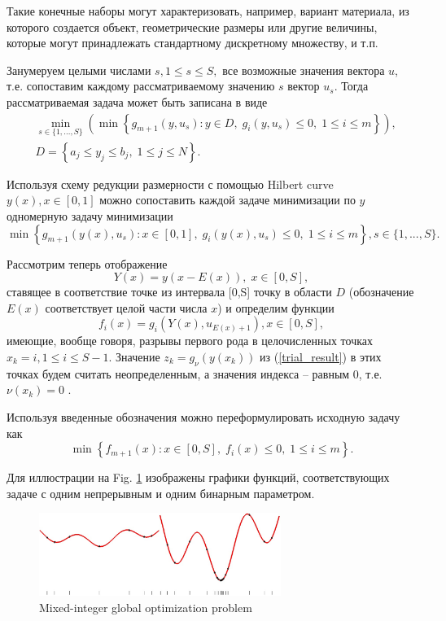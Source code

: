 \documentclass[
11pt,%
tightenlines,%
twoside,%
onecolumn,%
nofloats,%
nobibnotes,%
nofootinbib,%
superscriptaddress,%
noshowpacs,%
centertags]%
{revtex4}
\begin{document}
Такие конечные наборы могут характеризовать, например, вариант материала, из которого создается объект, геометрические размеры или другие величины, которые могут принадлежать стандартному дискретному множеству, и т.п.

Занумеруем целыми числами $s, 1\leq s \leq S,$ все возможные значения вектора $u$, т.е. сопоставим каждому рассматриваемому значению $s$ вектор $u_s$. 
Тогда рассматриваемая задача может быть записана в виде 
\begin{eqnarray}\label{problem_is}
& \min_{s\in\{1,...,S\}}\left(\min{\left\{ g_{m+1}(y,u_s):y\in D, \; g_i(y,u_s)\leq 0, \; 1 \leq i \leq m\right\}}\right),\\
& D=\left\{ a_j\leq y_j \leq b_j, \; 1 \leq j\leq N \right\}.\nonumber 
\end{eqnarray}

Используя схему редукции размерности с помощью Hilbert curve $y(x), x\in [0,1]$ можно сопоставить каждой задаче минимизации по $y$ одномерную задачу минимизации
\[
 \min{\left\{ g_{m+1}(y(x),u_s):x \in [0,1], \; g_i(y(x),u_s)\leq 0, \; 1 \leq i \leq m\right\}}, s\in\{1,...,S\}.
\]

Рассмотрим теперь отображение 
\[
Y(x)=y(x-E(x)), \; x\in[0,S],
\]
ставящее в соответствие точке из интервала [0,S] точку в области $D$ (обозначение $E(x)$ соответствует целой части числа $x$) и определим функции 
\[
f_i(x) = g_i(Y(x),u_{E(x)+1}), x\in[0,S],
\]
имеющие, вообще говоря, разрывы первого рода в целочисленных точках $x_k = i, 1\leq i \leq S-1$.
Значение  $z_k = g_\nu(y(x_k))$ из (\ref{trial_result}) в этих точках будем считать неопределенным, а значения индекса -- равным 0, т.е. $\nu(x_k) = 0$ .

Используя введенные обозначения можно переформулировать исходную задачу как
\begin{equation}\label{problem_is1}
\min \left\{f_{m+1}(x): x \in [0,S], \; f_i(x) \leq 0, \; 1 \leq i \leq m\right\}.
\end{equation}

Для иллюстрации на Fig. \ref{fig:1}  изображены графики функций, соответствующих задаче с одним непрерывным и одним бинарным параметром.
\begin{figure}[ht]
    \centering
    \includegraphics[width=0.7\textwidth]{fig1.jpg}
    \caption{Mixed-integer global optimization problem}
    \label{fig:1}
\end{figure}
\end{document}
